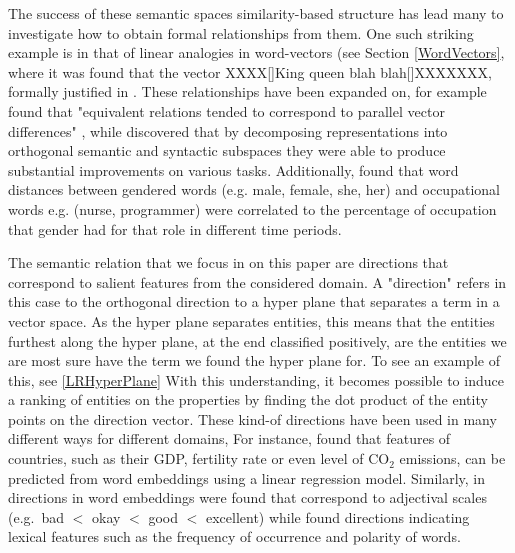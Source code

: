 The success of these semantic spaces similarity-based structure has lead many to investigate how to obtain formal relationships from them. One such striking example is in that of linear analogies in word-vectors (see Section \ref{WordVectors}, where it was found that the vector XXXX[]King queen blah blah[]XXXXXXX, formally justified in \cite{Ethayarajh2018}. %
These relationships have been expanded on, for example \cite{TomasMikolovWen-tauYih2013} found that "equivalent relations tended to correspond to parallel vector differences" \cite{Mitchell2015}, while \cite{Mitchell2015} discovered that by decomposing representations into orthogonal semantic and syntactic subspaces they were able to produce substantial improvements on various tasks. Additionally, \cite{Garg2017} found that word distances between gendered words (e.g. male, female, she, her) and occupational words e.g. (nurse, programmer) were correlated to the percentage of occupation that gender had for that role in different time periods. %


The semantic relation that we focus in on this paper are directions that correspond to salient features from the considered domain. A "direction" refers in this case to the orthogonal direction to a hyper plane that separates a term in a vector space. As the hyper plane separates entities, this means that the entities furthest along the hyper plane, at the end classified positively, are the entities we are most sure have the term we found the hyper plane for. To see an example of this, see \ref {LRHyperPlane} With this understanding, it becomes possible to induce a ranking of entities on the properties by finding the dot product of the entity points on the direction vector. These kind-of directions have been used in many different ways for different domains, For instance,  \cite{gupta2015distributional} found that features of countries, such as their GDP, fertility rate or even level of CO$_2$ emissions, can be predicted from word embeddings using a linear regression model. Similarly, in \cite{kim2013deriving} directions in word embeddings were found that correspond to adjectival scales (e.g.\ bad $<$ okay $<$ good $<$ excellent) while \cite{DBLP:conf/acl/RotheS16} found directions indicating lexical features such as the frequency of occurrence and polarity of words. 


